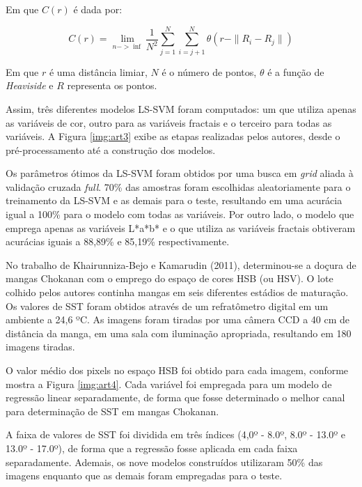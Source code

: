 Em que $C(r)$ é dada por:

\begin{equation} \label{eq:c}
	C(r) = \lim_{n->\inf}\frac{1}{N^2} \sum_{j=1}^N \sum_{i=j+1}^N \theta (r - \|R_i - R_j\|)
\end{equation}

Em que $r$ é uma distância limiar, $N$ é o número de pontos, $\theta$ é a função de \textit{Heaviside} e $R$ representa os pontos.

Assim, três diferentes modelos LS-SVM foram computados: um que utiliza apenas as variáveis de cor, outro para as variáveis fractais e o terceiro para todas as variáveis. A Figura \ref{img:art3} exibe as etapas realizadas pelos autores, desde o pré-processamento até a construção dos modelos.


Os parâmetros ótimos da LS-SVM foram obtidos por uma busca em \textit{grid} aliada à validação cruzada \textit{full}. 70\% das amostras foram escolhidas aleatoriamente para o treinamento da LS-SVM e as demais para o teste, resultando em uma acurácia igual a 100\% para o modelo com todas as variáveis. Por outro lado, o modelo que emprega apenas as variáveis L*a*b* e o que utiliza as variáveis fractais obtiveram acurácias iguais a 88,89\% e 85,19\% respectivamente. 

No trabalho de Khairunniza-Bejo e Kamarudin (2011), determinou-se a doçura de mangas Chokanan com o emprego do espaço de cores HSB (ou HSV). O lote colhido pelos autores continha mangas em seis diferentes estádios de maturação. Os valores de SST foram obtidos através de um refratômetro digital em um ambiente a 24,6 ºC. As imagens foram tiradas por uma câmera CCD a 40 cm de distância da manga, em uma sala com iluminação apropriada, resultando em 180 imagens tiradas.

O valor médio dos pixels no espaço HSB foi obtido para cada imagem, conforme mostra a Figura \ref{img:art4}. Cada variável foi empregada para um modelo de regressão linear separadamente, de forma que fosse determinado o melhor canal para determinação de SST em mangas Chokanan.


A faixa de valores de SST foi dividida em três índices (4,0º - 8.0º, 8.0º - 13.0º e 13.0º - 17.0º), de forma que a regressão fosse aplicada em cada faixa separadamente. Ademais, os nove modelos construídos utilizaram 50\% das imagens enquanto que as demais foram empregadas para o teste. 

